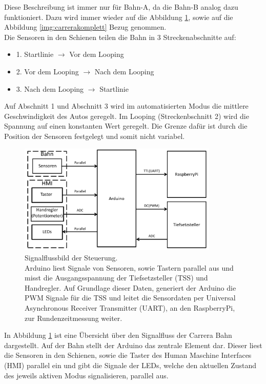 \documentclass[a4paper, 11pt]{report}
\begin{document}
	Diese Beschreibung ist immer nur für Bahn-A, da die
	Bahn-B analog dazu funktioniert. Dazu wird immer wieder auf die Abbildung \ref{img:signalfluss}, sowie auf die \\Abbildung
	\ref{img:carrerakomplett} Bezug genommen.\\
	Die Sensoren in den Schienen teilen die Bahn in 3 Streckenabschnitte auf:
	\begin{itemize}
		\item{1.} Startlinie $\rightarrow$ Vor dem Looping
		\item{2.} Vor dem Looping $\rightarrow$ Nach dem Looping
		\item{3.} Nach dem Looping $\rightarrow$ Startlinie
	\end{itemize}
	Auf Abschnitt 1 und Abschnitt 3 wird im automatisierten Modus die mittlere Geschwindigkeit des Autos geregelt.
	Im Looping (Streckenbschnitt 2) wird die Spannung auf einen konstanten Wert geregelt.
	Die Grenze dafür ist durch die Position der Sensoren festgelegt und somit nicht variabel.
	\begin{figure}[ht]
		\centering
		\includegraphics[width=0.85\textwidth]{rec/signalfluss.pdf}
		\caption[Signalflussbild der Steuerung]{Signalflussbild der Steuerung. \\Arduino liest Signale von Sensoren, sowie Tastern parallel aus und misst die Ausgangsspannung der Tiefsetzsteller (TSS) und Handregler. Auf Grundlage dieser Daten, generiert der Arduino die PWM Signale für die TSS und leitet die Sensordaten per Universal Asynchronous Receiver Transmitter (UART), an den RaspberryPi, zur Rundenzeitmessung weiter.}
		\label{img:signalfluss}
	\end{figure}
	In Abbildung \ref{img:signalfluss} ist eine Übersicht über den Signalfluss der Carrera Bahn dargestellt.
	Auf der Bahn stellt der Arduino das zentrale Element dar.
	Dieser liest die Sensoren in den Schienen, sowie die Taster des Human Maschine Interfaces (HMI) parallel ein und gibt die Signale der LEDs, welche den aktuellen Zustand des jeweils aktiven Modus signalisieren, parallel aus.
\end{document}
